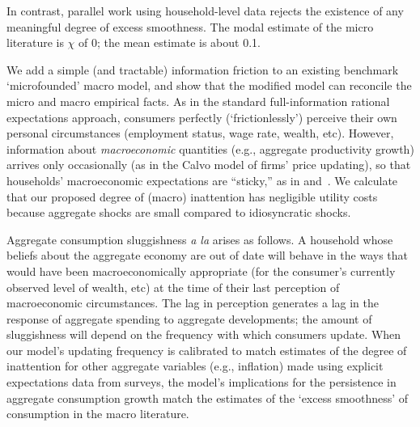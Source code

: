 \documentclass[titlepage]{./econtex}
\begin{document}
In contrast, parallel work using household-level data rejects the existence of any meaningful degree of excess smoothness.  The modal estimate of the micro literature is $\chi$ of 0; the mean estimate is about 0.1. 


We add a simple (and tractable) information friction to an existing benchmark `microfounded' macro model, and show that the modified model can reconcile the micro and macro empirical facts. As in the standard full-information rational expectations approach, consumers perfectly (`frictionlessly') perceive their own personal circumstances (employment status, wage rate, wealth, etc). However, information about \textit{macroeconomic} quantities (e.g., aggregate productivity growth) arrives only occasionally (as in the Calvo model of firms' price updating), so that households' macroeconomic expectations are ``sticky,'' as in \cite{mrSlumps} and~\cite{carroll:epidemicinflQJE}. We calculate that our proposed degree of (macro) inattention has negligible utility costs because aggregate shocks are small compared to idiosyncratic shocks.

Aggregate consumption sluggishness \textit{a la} \cite{cdSmooth} arises as follows.  A household whose beliefs about the aggregate economy are out of date will behave in the ways that would have been macroeconomically appropriate (for the consumer's currently observed level of wealth, etc) at the time of their last perception of macroeconomic circumstances.  The lag in perception generates a lag in the response of aggregate spending to aggregate developments; the amount of sluggishness will depend on the frequency with which consumers update.  When our model's updating frequency is calibrated to match estimates of the degree of inattention for other aggregate variables (e.g., inflation) made using explicit expectations data from surveys, the model's implications for the persistence in aggregate consumption growth match the estimates of the `excess smoothness' of consumption in the macro literature. 

\hypertarget{dynanR2}{}
\hypertarget{Excess-Sesitivity-Flag}{} 
\end{document}
